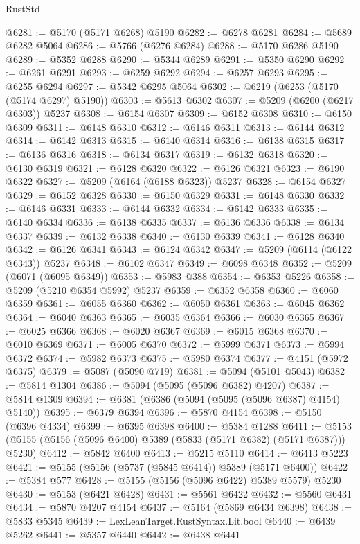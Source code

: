 \begin{lexlean}{RustStd}
\begin{coremodule}
@6281 := @5170 (@5171 @6268) @5190
@6282 := @6278 @6281
@6284 := @5689 @6282 @5064
@6286 := @5766 (@6276 @6284)
@6288 := @5170 @6286 @5190
@6289 := @5352 @6288
@6290 := @5344 @6289
@6291 := @5350 @6290
@6292 := @6261 @6291
@6293 := @6259 @6292
@6294 := @6257 @6293
@6295 := @6255 @6294
@6297 := @5342 @6295 @5064
@6302 := @6219 (@6253 (@5170 (@5174 @6297) @5190))
@6303 := @5613 @6302
@6307 := @5209 (@6200 (@6217 @6303)) @5237
@6308 := @6154 @6307
@6309 := @6152 @6308
@6310 := @6150 @6309
@6311 := @6148 @6310
@6312 := @6146 @6311
@6313 := @6144 @6312
@6314 := @6142 @6313
@6315 := @6140 @6314
@6316 := @6138 @6315
@6317 := @6136 @6316
@6318 := @6134 @6317
@6319 := @6132 @6318
@6320 := @6130 @6319
@6321 := @6128 @6320
@6322 := @6126 @6321
@6323 := @6190 @6322
@6327 := @5209 (@6164 (@6188 @6323)) @5237
@6328 := @6154 @6327
@6329 := @6152 @6328
@6330 := @6150 @6329
@6331 := @6148 @6330
@6332 := @6146 @6331
@6333 := @6144 @6332
@6334 := @6142 @6333
@6335 := @6140 @6334
@6336 := @6138 @6335
@6337 := @6136 @6336
@6338 := @6134 @6337
@6339 := @6132 @6338
@6340 := @6130 @6339
@6341 := @6128 @6340
@6342 := @6126 @6341
@6343 := @6124 @6342
@6347 := @5209 (@6114 (@6122 @6343)) @5237
@6348 := @6102 @6347
@6349 := @6098 @6348
@6352 := @5209 (@6071 (@6095 @6349))
@6353 := @5983 @388
@6354 := @6353 @5226
@6358 := @5209 (@5210 @6354 @5992) @5237
@6359 := @6352 @6358
@6360 := @6060 @6359
@6361 := @6055 @6360
@6362 := @6050 @6361
@6363 := @6045 @6362
@6364 := @6040 @6363
@6365 := @6035 @6364
@6366 := @6030 @6365
@6367 := @6025 @6366
@6368 := @6020 @6367
@6369 := @6015 @6368
@6370 := @6010 @6369
@6371 := @6005 @6370
@6372 := @5999 @6371
@6373 := @5994 @6372
@6374 := @5982 @6373
@6375 := @5980 @6374
@6377 := @4151 (@5972 @6375)
@6379 := @5087 (@5090 @719)
@6381 := @5094 (@5101 @5043)
@6382 := @5814 @1304
@6386 := @5094 (@5095 (@5096 @6382) @4207)
@6387 := @5814 @1309
@6394 := @6381 (@6386 (@5094 (@5095 (@5096 @6387) @4154) @5140))
@6395 := @6379 @6394
@6396 := @5870 @4154
@6398 := @5150 (@6396 @4334)
@6399 := @6395 @6398
@6400 := @5384 @1288
@6411 := @5153 (@5155 (@5156 (@5096 @6400) @5389 (@5833 (@5171 @6382) (@5171 @6387))) @5230)
@6412 := @5842 @6400
@6413 := @5215 @5110
@6414 := @6413 @5223
@6421 := @5155 (@5156 (@5737 (@5845 @6414)) @5389 (@5171 @6400))
@6422 := @5384 @577
@6428 := @5155 (@5156 (@5096 @6422) @5389 @5579) @5230
@6430 := @5153 (@6421 @6428)
@6431 := @5561 @6422
@6432 := @5560 @6431
@6434 := @5870 @4207 @4154
@6437 := @5164 (@5869 @6434 @6398)
@6438 := @5833 @5345
@6439 := LexLeanTarget.RustSyntax.Lit.bool
@6440 := @6439 @5262
@6441 := @5357 @6440
@6442 := @6438 @6441

\end{coremodule}
\end{lexlean}
